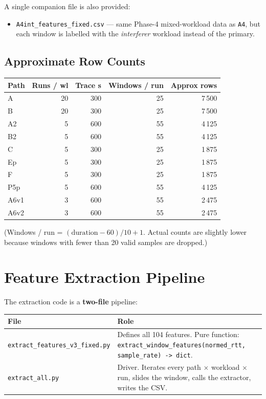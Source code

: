 \documentclass[11pt,a4paper]{article}
\begin{document}
A single companion file is also provided:
\begin{itemize}[leftmargin=*]
  \item \texttt{A4int\_features\_fixed.csv} --- same Phase-4 mixed-workload
        data as \texttt{A4}, but each window is labelled with the
        \emph{interferer} workload instead of the primary.
\end{itemize}

\subsection{Approximate Row Counts}

\begin{tabular}{@{}lrrrr@{}}
\toprule
\textbf{Path} & \textbf{Runs / wl} & \textbf{Trace s} & \textbf{Windows / run} & \textbf{Approx rows} \\
\midrule
A    & 20 & 300 & 25 & 7\,500 \\
B    & 20 & 300 & 25 & 7\,500 \\
A2   & 5  & 600 & 55 & 4\,125 \\
B2   & 5  & 600 & 55 & 4\,125 \\
C    & 5  & 300 & 25 & 1\,875 \\
Ep   & 5  & 300 & 25 & 1\,875 \\
F    & 5  & 300 & 25 & 1\,875 \\
P5p  & 5  & 600 & 55 & 4\,125 \\
A6v1 & 3  & 600 & 55 & 2\,475 \\
A6v2 & 3  & 600 & 55 & 2\,475 \\
\bottomrule
\end{tabular}

(Windows / run = $(\text{duration} - 60) / 10 + 1$. Actual counts are
slightly lower because windows with fewer than 20 valid samples are dropped.)

\section{Feature Extraction Pipeline}

The extraction code is a \textbf{two-file} pipeline:

\begin{tabular}{@{}lp{10cm}@{}}
\toprule
\textbf{File} & \textbf{Role} \\
\midrule
\texttt{extract\_features\_v3\_fixed.py} & Defines all 104 features. Pure function: \texttt{extract\_window\_features(normed\_rtt, sample\_rate) -> dict}. \\
\texttt{extract\_all.py} & Driver. Iterates every path $\times$ workload $\times$ run, slides the window, calls the extractor, writes the CSV. \\
\bottomrule
\end{tabular}
\end{document}
